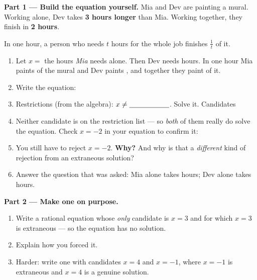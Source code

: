 \documentclass[10pt]{article}
\begin{document}
\begin{tcolorbox}[colback=white, colframe=black!40, title=\textbf{Tier E --- Extension},
    fonttitle=\bfseries, arc=1.5mm, left=3mm, right=3mm, top=2mm, bottom=2mm, breakable]
\textbf{Part 1 --- Build the equation yourself.} Mia and Dev are painting a mural. Working alone, Dev
takes \textbf{3 hours longer} than Mia. Working together, they finish in \textbf{2 hours}.

\vspace{2pt}
{\small In one hour, a person who needs $t$ hours for the whole job finishes $\frac{1}{t}$ of it.}
\begin{enumerate}[label=(\alph*), leftmargin=2.1em, itemsep=5pt]
  \item Let $x=$ the hours \emph{Mia} needs alone. Then Dev needs \blank{1.6cm} hours. In one hour
        Mia paints \blank{1.2cm} of the mural and Dev paints \blank{1.4cm}, and together they
        paint \blank{1.2cm} of it.
  \item Write the equation: \; \blank{6.0cm}
  \item Restrictions (from the algebra): $x\neq\blank{2.0cm}$. \; Solve it. Candidates
        \blank{2.4cm}
  \item Neither candidate is on the restriction list --- so \emph{both} of them really do solve the
        equation. Check $x=-2$ in your equation to confirm it: \blank{4.0cm}
  \item You still have to reject $x=-2$. \textbf{Why?} And why is that a \emph{different} kind of
        rejection from an extraneous solution? 
  \item Answer the question that was asked: Mia alone takes \blank{1.4cm} hours; Dev alone takes
        \blank{1.4cm} hours.
\end{enumerate}

\vspace{5pt}
\textbf{Part 2 --- Make one on purpose.}
\begin{enumerate}[label=(\alph*), leftmargin=2.1em, itemsep=5pt]
  \item Write a rational equation whose \emph{only} candidate is $x=3$ and for which $x=3$ is
        extraneous --- so the equation has no solution. \; \blank{6.0cm}
  \item Explain how you forced it. \writeline
  \item Harder: write one with candidates $x=4$ and $x=-1$, where $x=-1$ is extraneous and $x=4$ is a
        genuine solution. \; \blank{6.0cm}
\end{enumerate}


\end{tcolorbox}
\end{document}
